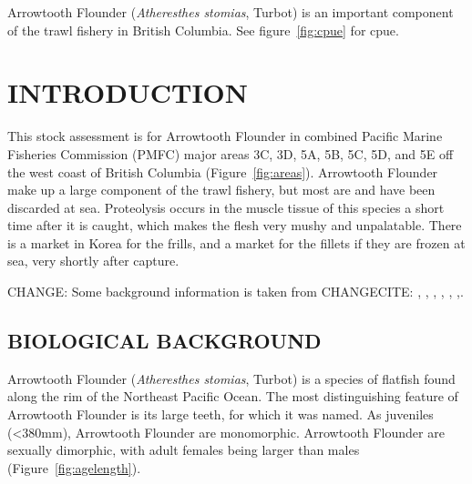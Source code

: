 

Arrowtooth Flounder (\emph{Atheresthes stomias}, Turbot) is an important component of the trawl fishery in British Columbia.
See figure~\ref{fig:cpue} for cpue.




\clearpage

\setcounter{page}{1}

\section{INTRODUCTION}

This stock assessment is for Arrowtooth Flounder in combined Pacific Marine Fisheries Commission (PMFC) major areas 3C, 3D, 5A, 5B, 5C, 5D, and 5E off the west coast of British Columbia (Figure~\ref{fig:areas}). Arrowtooth Flounder make up a large component of the trawl fishery, but most are and have been discarded at sea. Proteolysis occurs in the muscle tissue of this species a short time after it is caught, which makes the flesh very mushy and unpalatable. There is a market in Korea for the frills, and a market for the fillets if they are frozen at sea, very shortly after capture.

CHANGE: Some background information is taken from  CHANGECITE: \citet{arf1999a}, \citet{arf1999b}, \citet{arf2000}, \citet{arf2001}, \citet{arf2003}, \citet{arf2006},\citet{arf2013}.

\subsection{BIOLOGICAL BACKGROUND}

Arrowtooth Flounder (\emph{Atheresthes stomias}, Turbot) is a species of flatfish found along the rim of the Northeast Pacific Ocean. The most distinguishing feature of Arrowtooth Flounder is its large teeth, for which it was named. As juveniles (<380mm), Arrowtooth Flounder are monomorphic. Arrowtooth Flounder are sexually dimorphic, with adult females being larger than males (Figure~\ref{fig:agelength}).

